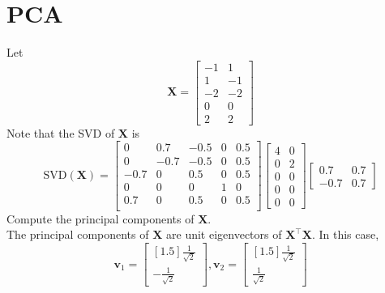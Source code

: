 \documentclass{article}
\begin{document}
\section{PCA}
Let $$\mathbf{X} = \begin{bmatrix} -1 & 1 \\ 1 & -1 \\ -2 & -2 \\ 0 & 0 \\ 2 & 2 \end{bmatrix}$$ Note that the SVD of $\mathbf{X}$ is $$\text{SVD}(\mathbf{X}) = \begin{bmatrix} 0 & 0.7 & -0.5 & 0 & 0.5 \\ 0 & -0.7 & -0.5 & 0 & 0.5 \\ -0.7 & 0 & 0.5 & 0 & 0.5 \\ 0 & 0 & 0 & 1 & 0 \\ 0.7 & 0 & 0.5 & 0 & 0.5 \\ \end{bmatrix}\begin{bmatrix} 4 & 0 \\ 0 & 2 \\ 0 & 0 \\ 0 & 0 \\ 0 & 0 \end{bmatrix}\begin{bmatrix}0.7 & 0.7 \\ -0.7 & 0.7 \end{bmatrix}$$ Compute the principal components of $\mathbf{X}$. \\
{\color{blue} The principal components of $\mathbf{X}$ are unit eigenvectors of $\mathbf{X^{\top}X}$. In this case, $$\mathbf{v}_1 = \begin{bmatrix}[1.5] \frac{1}{\sqrt{2}} \\ -\frac{1}{\sqrt{2}}  \end{bmatrix}, \mathbf{v}_2 =  \begin{bmatrix}[1.5] \frac{1}{\sqrt{2}} \\ \frac{1}{\sqrt{2}}  \end{bmatrix}$$}
\end{document}

